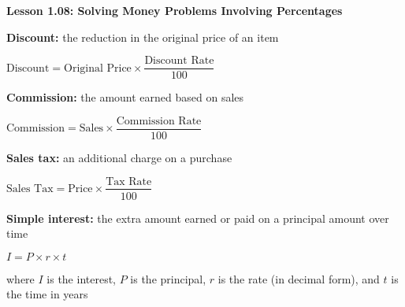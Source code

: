 \begin{center}
\textbf{Lesson 1.08: Solving Money Problems Involving Percentages}
\end{center}

\vspace*{-1.5ex}

\noindent \textbf{Discount:} the reduction in the original price of an item

{\centering $\text{Discount} = \text{Original Price} \times \dfrac{\text{Discount Rate}}{100}$\par}

\noindent \textbf{Commission:} the amount earned based on sales

{\centering $\text{Commission} = \text{Sales} \times \dfrac{\text{Commission Rate}}{100}$\par}

\noindent  \textbf{Sales tax:} an additional charge on a purchase

{\centering $    \text{Sales Tax} = \text{Price} \times \dfrac{\text{Tax Rate}}{100}$\par}

\noindent  \textbf{Simple interest:} the extra amount earned or paid on a principal amount over time %

{\centering $    I = P \times r \times t $\par}

\noindent     where \( I \) is the interest, \( P \) is the principal, \( r \) is the rate (in decimal form), and \( t \) is the time in years

